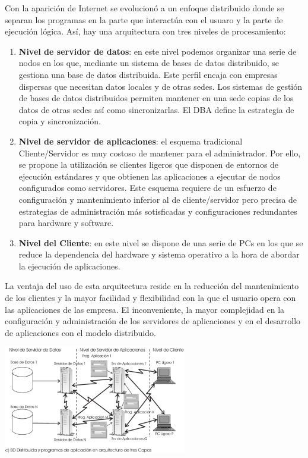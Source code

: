 \documentclass[10pt,a4paper,spanish]{report}
\begin{document}
Con la aparición de Internet se evolucionó a un enfoque distribuido donde se separan los programas en la parte que interactúa con el usuaro y la parte de ejecución lógica. Así, hay una arquitectura con tres niveles de procesamiento:

\begin{enumerate}[$\heartsuit$]
    \item \textcolor[rgb]{1,0.2,0.3}{\textbf{Nivel de servidor de datos}}: en este nivel podemos organizar una serie de nodos en los que, mediante un sistema de bases de datos distribuido, se gestiona una base de datos distribuida. Este perfil encaja con empresas dispersas que necesitan datos locales y de otras sedes. Los sistemas de gestión de bases de datos distribuidos permiten mantener en una sede copias de los datos de otras sedes así como sincronizarlas. El DBA define la estrategia de copia y sincronización.
    \item \textcolor[rgb]{1,0.2,0.3}{\textbf{Nivel de servidor de aplicaciones}}: el esquema tradicional Cliente/Servidor es muy costoso de mantener para el administrador. Por ello, se propone la utilización se clientes ligeros que disponen de entornos de ejecución estándares y que obtienen las aplicaciones a ejecutar de nodos configurados como servidores. Este esquema requiere de un esfuerzo de configuración y mantenimiento inferior al de cliente/servidor pero precisa de estrategias de administración más sotisficadas y configuraciones redundantes para hardware y software.
    \item \textcolor[rgb]{1,0.2,0.3}{\textbf{Nivel del Cliente}}: en este nivel se dispone de una serie de PCs en los que se reduce la dependencia del hardware y sistema operativo a la hora de abordar la ejecución de aplicaciones.
\end{enumerate}

La ventaja del uso de esta arquitectura reside en la reducción del mantenimiento de los clientes y la mayor facilidad y flexibilidad con la que el usuario  opera con las aplicaciones de las empresa. El inconveniente, la mayor complejidad en la configuración y administración de los servidores de aplicaciones y en el desarrollo de  aplicaciones con el modelo distribuido.

\begin{center}
\includegraphics[width=0.6\textwidth]{adistribuida}
\end{center}
\end{document}
